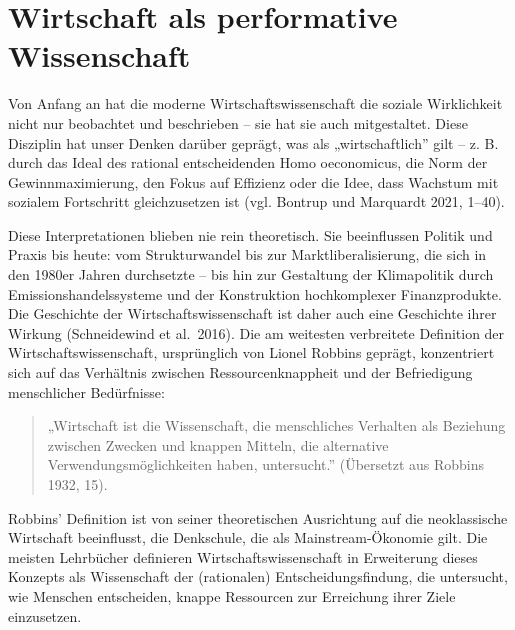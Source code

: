 \documentclass[
  nswissgerman,
  a4paper,
  DIV=11,
  numbers=noendperiod,
  oneside,
  openany]{scrreprt}
\begin{document}
\section{Wirtschaft als performative
Wissenschaft}\label{wirtschaft-als-performative-wissenschaft}

Von Anfang an hat die moderne Wirtschaftswissenschaft die soziale
Wirklichkeit nicht nur beobachtet und beschrieben -- sie hat sie auch
mitgestaltet. Diese Disziplin hat unser Denken darüber geprägt, was als
„wirtschaftlich'' gilt -- z. B. durch das Ideal des rational
entscheidenden Homo oeconomicus, die Norm der Gewinnmaximierung, den
Fokus auf Effizienz oder die Idee, dass Wachstum mit sozialem
Fortschritt gleichzusetzen ist (vgl. Bontrup und Marquardt 2021, 1--40).

Diese Interpretationen blieben nie rein theoretisch. Sie beeinflussen
Politik und Praxis bis heute: vom Strukturwandel bis zur
Marktliberalisierung, die sich in den 1980er Jahren durchsetzte -- bis
hin zur Gestaltung der Klimapolitik durch Emissionshandelssysteme und
der Konstruktion hochkomplexer Finanzprodukte. Die Geschichte der
Wirtschaftswissenschaft ist daher auch eine Geschichte ihrer Wirkung
(Schneidewind et al.~2016). Die am weitesten verbreitete Definition der
Wirtschaftswissenschaft, ursprünglich von Lionel Robbins geprägt,
konzentriert sich auf das Verhältnis zwischen Ressourcenknappheit und
der Befriedigung menschlicher Bedürfnisse:

\begin{quote}
„Wirtschaft ist die Wissenschaft, die menschliches Verhalten als
Beziehung zwischen Zwecken und knappen Mitteln, die alternative
Verwendungsmöglichkeiten haben, untersucht.'' (Übersetzt aus Robbins
1932, 15).
\end{quote}

Robbins' Definition ist von seiner theoretischen Ausrichtung auf die
neoklassische Wirtschaft beeinflusst, die Denkschule, die als
Mainstream-Ökonomie gilt. Die meisten Lehrbücher definieren
Wirtschaftswissenschaft in Erweiterung dieses Konzepts als Wissenschaft
der (rationalen) Entscheidungsfindung, die untersucht, wie Menschen
entscheiden, knappe Ressourcen zur Erreichung ihrer Ziele einzusetzen.
\end{document}
